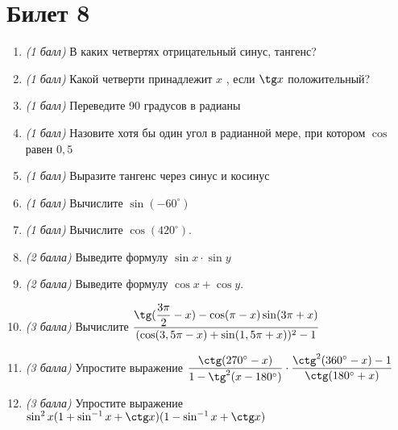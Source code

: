 \documentclass[12pt, a4paper]{article}
\begin{document}
	\section*{Билет 8}
	\begin{enumerate}
		\item \textit{(1 балл)}	В каких четвертях отрицательный синус, тангенс?
		\item \textit{(1 балл)}	Какой четверти принадлежит $x$ , если $\tg x$ положительный?
		\item \textit{(1 балл)}	Переведите 90 градусов в радианы
		\item \textit{(1 балл)}	Назовите хотя бы один угол в радианной мере, при котором $\cos$  равен $0,5$
		\item \textit{(1 балл)} Выразите тангенс через синус и косинус
		\item \textit{(1 балл)} Вычислите $\sin (-60^{\circ})$
		\item \textit{(1 балл)}	Вычислите $\cos (420^{\circ})$.
		\item \textit{(2 балла)} Выведите формулу $\sin x \cdot \sin y$ 
		\item \textit{(2 балла)} Выведите формулу $\cos x + \cos y$.
		\item \textit{(3 балла)} Вычислите $\dfrac{\tg (\dfrac{3\pi}{2}-x)-\cos(\pi - x) \sin(3\pi + x)}{(\cos(3,5\pi - x)+ \sin (1,5 \pi + x))^2-1}$
		\item \textit{(3 балла)} Упростите выражение $\dfrac{\ctg(270^{\circ}-x)}{1-\tg^2(x-180^{\circ})} \cdot \dfrac{\ctg^2(360^{\circ}-x)-1}{\ctg(180^{\circ}+x)}$
		\item \textit{(3 балла)} Упростите выражение $\sin^2 x(1+\sin^{-1}x + \ctg x)(1 - \sin^{-1}x + \ctg x)$
	\end{enumerate}
	
	\newpage 
	
\end{document}
